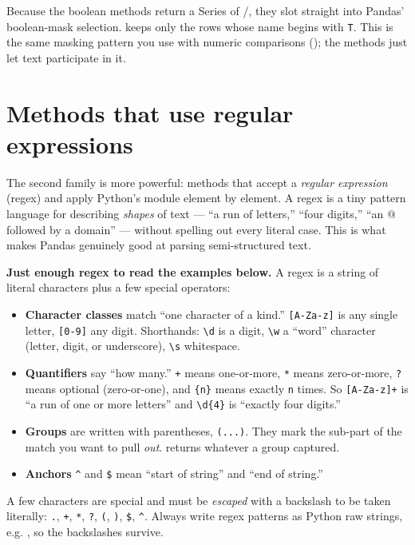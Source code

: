 \documentclass[11pt]{article}
\begin{document}
\begin{intuition}
Because the boolean methods return a Series of /, they slot straight into Pandas' boolean-mask selection.  keeps only the rows whose name begins with \texttt{T}. This is the same masking pattern you use with numeric comparisons (); the  methods just let text participate in it.
\end{intuition}

\section{Methods that use regular expressions}

The second family is more powerful: methods that accept a \emph{regular expression} (regex) and apply Python's  module element by element. A regex is a tiny pattern language for describing \emph{shapes} of text --- ``a run of letters,'' ``four digits,'' ``an @ followed by a domain'' --- without spelling out every literal case. This is what makes Pandas genuinely good at parsing semi-structured text.

\begin{pyrefresh}
\textbf{Just enough regex to read the examples below.} A regex is a string of literal characters plus a few special operators:
\begin{itemize}
  \item \textbf{Character classes} match ``one character of a kind.'' \verb![A-Za-z]! is any single letter, \verb![0-9]! any digit. Shorthands: \verb!\d! is a digit, \verb!\w! a ``word'' character (letter, digit, or underscore), \verb!\s! whitespace.
  \item \textbf{Quantifiers} say ``how many.'' \verb!+! means one-or-more, \verb!*! means zero-or-more, \verb!?! means optional (zero-or-one), and \verb!{n}! means exactly \texttt{n} times. So \verb![A-Za-z]+! is ``a run of one or more letters'' and \verb!\d{4}! is ``exactly four digits.''
  \item \textbf{Groups} are written with parentheses, \verb!(...)!. They mark the sub-part of the match you want to pull \emph{out}.  returns whatever a group captured.
  \item \textbf{Anchors} \verb!^! and \verb!$! mean ``start of string'' and ``end of string.''
\end{itemize}
A few characters are special and must be \emph{escaped} with a backslash to be taken literally: \verb!.!, \verb!+!, \verb!*!, \verb!?!, \verb!(!, \verb!)!, \verb!$!, \verb!^!. Always write regex patterns as Python raw strings, e.g. , so the backslashes survive.
\end{pyrefresh}
\end{document}
